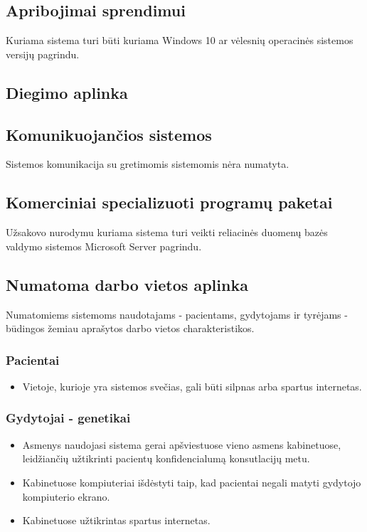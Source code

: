 \documentclass[12pt]{article}
\begin{document}
\subsection{Apribojimai sprendimui}
Kuriama sistema turi būti kuriama Windows 10 ar vėlesnių operacinės sistemos
versijų pagrindu.

\subsection{Diegimo aplinka}

\subsection{Komunikuojančios sistemos}
Sistemos komunikacija su gretimomis sistemomis nėra numatyta.

\subsection{Komerciniai specializuoti programų paketai}
Užsakovo nurodymu kuriama sistema turi veikti reliacinės duomenų bazės valdymo
sistemos Microsoft Server pagrindu.

\subsection{Numatoma darbo vietos aplinka}
Numatomiems sistemoms naudotajams - pacientams, gydytojams ir tyrėjams -
būdingos žemiau aprašytos darbo vietos charakteristikos.

\subsubsection*{Pacientai}
\begin{itemize}
    \item Vietoje, kurioje yra sistemos svečias, gali būti silpnas arba spartus
    internetas.
\end{itemize}

\subsubsection*{Gydytojai - genetikai}
\begin{itemize}
    \item Asmenys naudojasi sistema gerai apšviestuose vieno asmens kabinetuose,
    leidžiančių užtikrinti pacientų konfidencialumą konsutlacijų metu.
    \item Kabinetuose kompiuteriai išdėstyti taip, kad pacientai negali matyti
    gydytojo kompiuterio ekrano.
    \item Kabinetuose užtikrintas spartus internetas.
\end{itemize}
\end{document}
